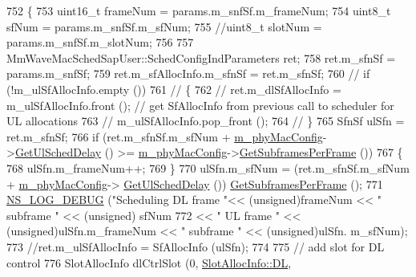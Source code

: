 \begin{DoxyCode}
752 \{
753         uint16\_t frameNum = params.m\_snfSf.m\_frameNum;
754         uint8\_t sfNum = params.m\_snfSf.m\_sfNum;
755         \textcolor{comment}{//uint8\_t slotNum = params.m\_snfSf.m\_slotNum;}
756 
757         MmWaveMacSchedSapUser::SchedConfigIndParameters ret;
758         ret.m\_sfnSf = params.m\_snfSf;
759         ret.m\_sfAllocInfo.m\_sfnSf = ret.m\_sfnSf;
760 \textcolor{comment}{//      if (!m\_ulSfAllocInfo.empty ())}
761 \textcolor{comment}{//      \{}
762 \textcolor{comment}{//              ret.m\_dlSfAllocInfo = m\_ulSfAllocInfo.front ();  // get SfAllocInfo from previous call to
       scheduler for UL allocations}
763 \textcolor{comment}{//              m\_ulSfAllocInfo.pop\_front ();}
764 \textcolor{comment}{//      \}}
765         SfnSf ulSfn = ret.m\_sfnSf;
766         \textcolor{keywordflow}{if} (ret.m\_sfnSf.m\_sfNum + \hyperlink{classns3_1_1MmWaveMacScheduler_a24d7af4971d2e500fe543cefbafa2fd9}{m\_phyMacConfig}->\hyperlink{classns3_1_1MmWavePhyMacCommon_afd70935ec71838fefe6a8e18198f19cb}{GetUlSchedDelay} () >=  
      \hyperlink{classns3_1_1MmWaveMacScheduler_a24d7af4971d2e500fe543cefbafa2fd9}{m\_phyMacConfig}->\hyperlink{classns3_1_1MmWavePhyMacCommon_a3709cf52f6813eb8ad1af16d95082dc1}{GetSubframesPerFrame} ())
767         \{
768                 ulSfn.m\_frameNum++;
769         \}
770         ulSfn.m\_sfNum = (ret.m\_sfnSf.m\_sfNum + \hyperlink{classns3_1_1MmWaveMacScheduler_a24d7af4971d2e500fe543cefbafa2fd9}{m\_phyMacConfig}->
      \hyperlink{classns3_1_1MmWavePhyMacCommon_afd70935ec71838fefe6a8e18198f19cb}{GetUlSchedDelay} ()) %
      \hyperlink{classns3_1_1MmWavePhyMacCommon_a3709cf52f6813eb8ad1af16d95082dc1}{GetSubframesPerFrame} ();
771         \hyperlink{group__logging_ga413f1886406d49f59a6a0a89b77b4d0a}{NS\_LOG\_DEBUG} (\textcolor{stringliteral}{"Scheduling DL frame "}<< (\textcolor{keywordtype}{unsigned})frameNum << \textcolor{stringliteral}{" subframe "} << (\textcolor{keywordtype}{unsigned})
      sfNum
772                       << \textcolor{stringliteral}{" UL frame "} << (\textcolor{keywordtype}{unsigned})ulSfn.m\_frameNum << \textcolor{stringliteral}{" subframe "} << (\textcolor{keywordtype}{unsigned})ulSfn.
      m\_sfNum);
773         \textcolor{comment}{//ret.m\_ulSfAllocInfo = SfAllocInfo (ulSfn);}
774 
775         \textcolor{comment}{// add slot for DL control}
776         SlotAllocInfo dlCtrlSlot (0, \hyperlink{structns3_1_1SlotAllocInfo_a6cad60db1d39034f1851e2cea625fe5da9a365c9c56b7c32dcae38ee1a468ce6d}{SlotAllocInfo::DL}, 

\end{DoxyCode}
